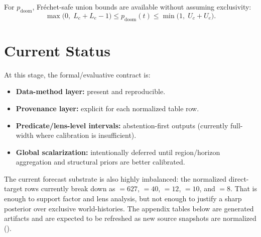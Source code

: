 \documentclass[11pt,openany]{report}
\begin{document}
For $p_{\mathrm{doom}}$, Fr\'{e}chet-safe union bounds are available
without assuming exclusivity:
\[
  \max\!\bigl(0,\;L_c + L_e - 1\bigr)
  \le p_{\mathrm{doom}}(t) \le
  \min\!\bigl(1,\;U_c + U_e\bigr).
\]

\section{Current Status}

At this stage, the formal/evaluative contract is:
\begin{itemize}
\item \textbf{Data-method layer:} present and reproducible.
\item \textbf{Provenance layer:} explicit for each normalized table row.
\item \textbf{Predicate/lens-level intervals:} abstention-first outputs
  (currently full-width where calibration is insufficient).
\item \textbf{Global scalarization:} intentionally deferred until
  region/horizon aggregation and structural priors are better calibrated.
\end{itemize}
The current forecast substrate is also highly imbalanced: the normalized
direct-target rows currently break down as
 $= 627$,
 $= 40$,
 $= 12$,
 $= 10$, and
 $= 8$.  That is enough to support
factor and lens analysis, but not enough to justify a sharp posterior
over exclusive world-histories.
The appendix tables below are generated artifacts and are expected to be
refreshed as new source snapshots are normalized
().

\begin{table}[htbp]
\centering
\caption{Current coarse-lens status table from the generated
aggregation summary artifact.}
\label{tab:ai-outcomes-branch-status}
\end{table}
\end{document}
